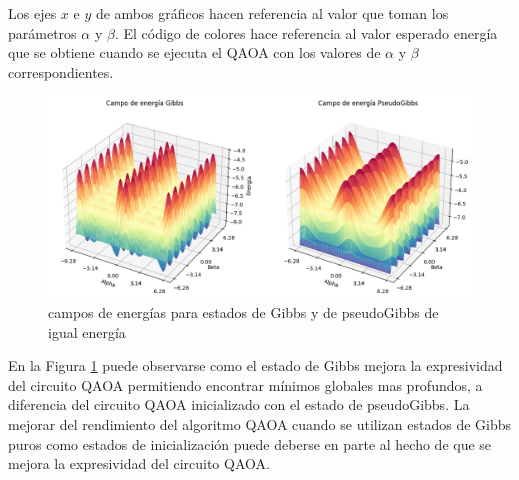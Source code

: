 \newpage

Los ejes $x$ e $y$ de ambos gráficos hacen referencia al valor que toman los parámetros $\alpha$ y $\beta$. El código de colores hace referencia al valor esperado energía que se obtiene cuando se ejecuta el QAOA con los valores de $\alpha$ y $\beta$ correspondientes.

\begin{figure}[!h]
    \centering
    \includegraphics[scale = 0.55]{plt/a07-energy_landscape.png}
    \caption{campos de energías para estados de Gibbs y de pseudoGibbs de igual energía}
    \label{fig:landscape_energy}
\end{figure}

En la Figura \ref{fig:landscape_energy} puede observarse como el estado de Gibbs mejora la expresividad del circuito QAOA permitiendo encontrar mínimos globales mas profundos, a diferencia del circuito QAOA inicializado con el estado de pseudoGibbs. La mejorar del rendimiento del algoritmo QAOA cuando se utilizan estados de Gibbs puros como estados de inicialización puede deberse en parte al hecho de que se mejora la expresividad del circuito QAOA.